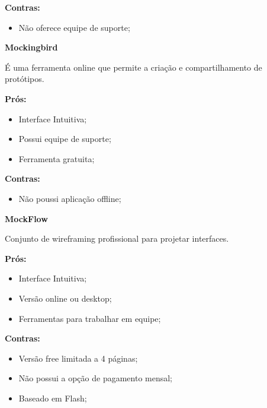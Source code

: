 \textbf{Contras:}
	
\begin{itemize}
  \item Não oferece equipe de suporte;
 \end{itemize}
     
     
     
\begin{center}
\textbf{Mockingbird}
\end{center}	

	É uma ferramenta online que permite a criação e compartilhamento de protótipos.
	
\textbf{Prós:}
	
\begin{itemize}
  \item Interface Intuitiva;
  \item Possui equipe de suporte;
  \item Ferramenta gratuita;
 \end{itemize}
 
\textbf{Contras:}
	
\begin{itemize}
  \item Não poussi aplicação offline;
 \end{itemize}
      
     
     
\begin{center}
\textbf{MockFlow}
\end{center}	

	Conjunto de wireframing profissional para projetar interfaces.
	
\textbf{Prós:}
	
\begin{itemize}
  \item Interface Intuitiva;
  \item Versão online ou desktop;
  \item Ferramentas para trabalhar em equipe;
\end{itemize}
 
\textbf{Contras:}
	
\begin{itemize}
  \item Versão free limitada a 4 páginas;
  \item Não possui a opção de pagamento mensal;
  \item Baseado em Flash;
\end{itemize}